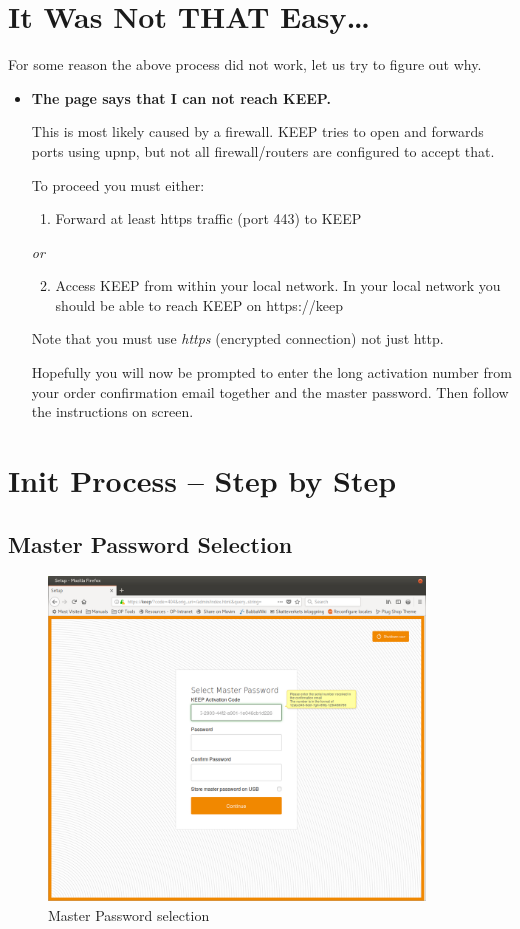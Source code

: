 \documentclass[12pt,a4paper,titlepage]{article}
\begin{document}
\FloatBarrier
\newpage
\section{It Was Not THAT Easy\ldots}
For some reason the above process did not work, let us try to figure out why.
\begin{itemize}
\item \textbf{The page says that I can not reach KEEP.}

This is most likely caused by a firewall. KEEP tries to open and forwards ports using upnp, but not all firewall/routers are configured to accept that.

To proceed you must either:
\begin{enumerate}
\item Forward at least https traffic (port 443) to KEEP
\end{enumerate}
\emph{or}
\begin{enumerate}
\setcounter{enumi}{1}
\item Access KEEP from within your local network. In your local network you should be able to reach KEEP on https://keep
\end{enumerate}

Note that you must use \emph{https} (encrypted connection) not just http.

Hopefully you will now be prompted to enter the long activation number from your order confirmation email together and the master password.
Then follow the instructions on screen.
\end{itemize}
\FloatBarrier
\newpage
\section{Init Process – Step by Step}
\subsection{Master Password Selection}
\begin{figure}[h!]
\centering
\includegraphics[width=10cm]{./img/master_pwd}
\caption{Master Password selection}
\end{figure}
\end{document}
